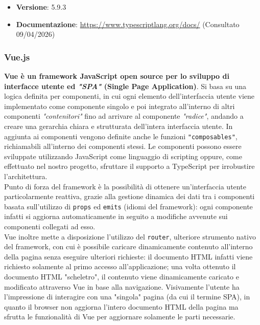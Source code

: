 \documentclass[a4paper,10pt]{article}
\begin{document}
\begin{itemize}
    \item \textbf{Versione}: 5.9.3
    \item \textbf{Documentazione}: \url{https://www.typescriptlang.org/docs/} (Consultato 09/04/2026)
\end{itemize}

\subsubsection{Vue.js}
\textbf{Vue è un framework JavaScript open source per lo sviluppo di interfacce utente ed \textit{"SPA"} (Single Page Application)}. Si basa su una logica definita per componenti, in cui ogni elemento dell'interfaccia utente viene implementato come componente singolo e poi integrato all'interno di altri componenti \textit{"contenitori"} fino ad arrivare al componente \textit{"radice"}, andando a creare una gerarchia chiara e strutturata dell'intera interfaccia utente. In aggiunta ai componenti vengono definite anche le funzioni \texttt{"composables"}, richiamabili all'interno dei componenti stessi. Le componenti possono essere sviluppate utilizzando JavaScript come linguaggio di scripting oppure, come effettuato nel nostro progetto, sfruttare il supporto a TypeScript per irrobustire l'architettura. \\

Punto di forza del framework è la possibilità di ottenere un'interfaccia utente particolarmente reattiva, grazie alla gestione dinamica dei dati tra i componenti basata sull'utilizzo di \texttt{props} ed \texttt{emits} (idiomi del framework): ogni componente infatti si aggiorna automaticamente in seguito a modifiche avvenute sui componenti collegati ad esso.\\

Vue inoltre mette a disposizione l'utilizzo del \texttt{router}, ulteriore strumento nativo del framework, con cui è possibile caricare dinamicamente contenuto all'interno della pagina senza eseguire ulteriori richieste: il documento HTML infatti viene richiesto solamente al primo accesso all'applicazione; una volta ottenuto il documento HTML "scheletro", il contenuto viene dinamicamente caricato e modificato attraverso Vue in base alla navigazione. Visivamente l'utente ha l'impressione di interagire con una "singola" pagina (da cui il termine SPA), in quanto il browser non aggiorna l'intero documento HTML della pagina ma sfrutta le funzionalità di Vue per aggiornare solamente le parti necessarie. \\
\end{document}
